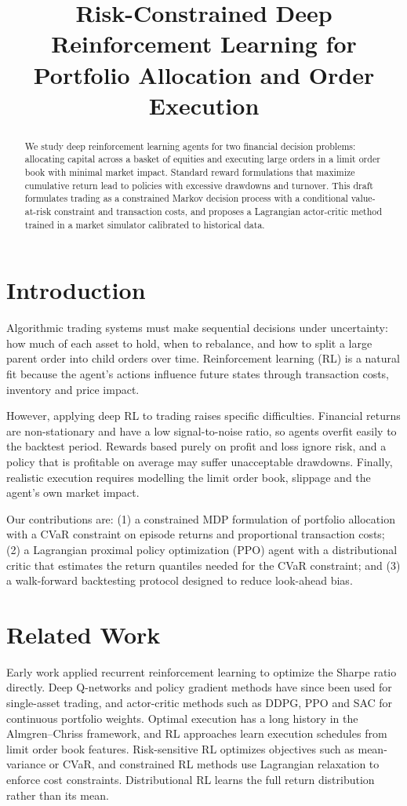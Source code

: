 \documentclass{article}
\title{Risk-Constrained Deep Reinforcement Learning for Portfolio Allocation and Order Execution}
\begin{document}
\maketitle

\begin{abstract}
We study deep reinforcement learning agents for two financial decision
problems: allocating capital across a basket of equities and executing large
orders in a limit order book with minimal market impact. Standard reward
formulations that maximize cumulative return lead to policies with excessive
drawdowns and turnover. This draft formulates trading as a constrained Markov
decision process with a conditional value-at-risk constraint and transaction
costs, and proposes a Lagrangian actor-critic method trained in a market
simulator calibrated to historical data.
\end{abstract}

\section{Introduction}
Algorithmic trading systems must make sequential decisions under uncertainty:
how much of each asset to hold, when to rebalance, and how to split a large
parent order into child orders over time. Reinforcement learning (RL) is a
natural fit because the agent's actions influence future states through
transaction costs, inventory and price impact.

However, applying deep RL to trading raises specific difficulties. Financial
returns are non-stationary and have a low signal-to-noise ratio, so agents
overfit easily to the backtest period. Rewards based purely on profit and loss
ignore risk, and a policy that is profitable on average may suffer
unacceptable drawdowns. Finally, realistic execution requires modelling the
limit order book, slippage and the agent's own market impact.

Our contributions are: (1) a constrained MDP formulation of portfolio
allocation with a CVaR constraint on episode returns and proportional
transaction costs; (2) a Lagrangian proximal policy optimization (PPO) agent
with a distributional critic that estimates the return quantiles needed for
the CVaR constraint; and (3) a walk-forward backtesting protocol designed to
reduce look-ahead bias.

\section{Related Work}
Early work applied recurrent reinforcement learning to optimize the Sharpe
ratio directly. Deep Q-networks and policy gradient methods have since been
used for single-asset trading, and actor-critic methods such as DDPG, PPO and
SAC for continuous portfolio weights. Optimal execution has a long history in
the Almgren--Chriss framework, and RL approaches learn execution schedules from
limit order book features. Risk-sensitive RL optimizes objectives such as
mean-variance or CVaR, and constrained RL methods use Lagrangian relaxation to
enforce cost constraints. Distributional RL learns the full return
distribution rather than its mean.
\end{document}
